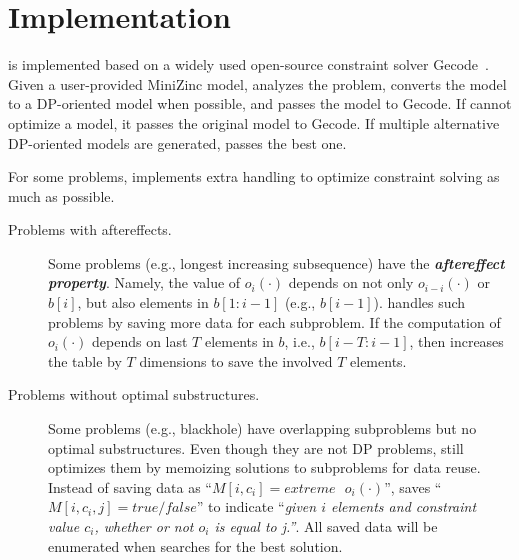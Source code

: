 \section{Implementation}
\label{sec:impl}

\tool is implemented based on a widely used  open-source constraint solver Gecode~\cite{schulte2006gecode}. 
Given a user-provided MiniZinc model, \tool analyzes the problem, converts the model to a DP-oriented model when possible, and passes the model to Gecode. 
If \tool cannot optimize a model, it passes the original model to Gecode. 
If multiple alternative DP-oriented models are generated, \tool passes the best one. 

For some problems, \tool implements extra handling to optimize constraint solving as much as possible. 

	\begin{description}
		\item[Problems with aftereffects.] 
		Some problems (e.g., longest increasing subsequence) have the \textbf{\emph{aftereffect property}}. Namely, the value of $o_i(\cdot)$ depends on not only $o_{i-i}(\cdot)$ or $b[i]$, but also elements in $b[1:i-1]$ (e.g., $b[i-1]$). \tool handles such problems by saving more data for each subproblem. If the computation of $o_i(\cdot)$ depends on last $T$ elements in $b$, i.e., $b[i-T:i-1]$, then \tool increases the table by $T$ dimensions to save the involved $T$ elements.  
		
		
		\item[Problems without optimal substructures.] Some problems (e.g., blackhole) have overlapping subproblems but no optimal substructures. Even though they are not DP problems, \tool still optimizes them by memoizing solutions to subproblems for data reuse. Instead of saving data as ``$M[i, c_i]=extreme\text{ }o_i(\cdot)$'', \tool saves ``$M[i, c_i, j]=true/false$'' to indicate ``\emph{given $i$ elements and constraint value $c_i$, whether or not $o_i$ is equal to j.''}. 
		All saved data will be enumerated when \tool searches for the best solution. 
		

\end{description}
